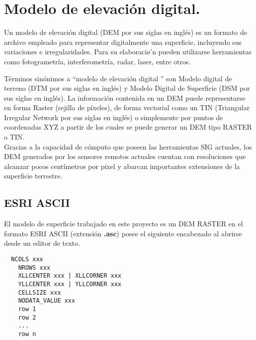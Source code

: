 \section{Modelo de elevaci\'{o}n digital.}


Un modelo de elevaci\'{o}n digital (DEM por sus siglas en ingl\'{e}s) es un formato de archivo empleado para representar digitalmente una superficie, incluyendo sus variaciones e irregularidades. Para su elaboraci\o'n pueden utilizarse herramientas como fotogrametr\'ia, interferometr\'ia, radar, laser, entre otros. \cite{whatisadem}


T\'{e}rminos sin\'{o}nimos a  ``modelo de elevaci\'{o}n digital '' son Modelo digital de terreno (DTM por
sus siglas en ingl\'{e}s) y Modelo Digital de Superficie (DSM por sus siglas en ingl\'{e}s).
La informaci\'{o}n contenida en un DEM puede representarse en forma Raster (rejilla de
p\'ixeles), de forma vectorial como un TIN (Triangular Irregular Network por sus siglas en
ingl\'{e}s) o simplemente por puntos de coordenadas XYZ a partir de los cuales se puede
generar un DEM tipo RASTER o TIN. \cite{tachikawa1994development} \\
 Gracias a la capacidad de c\'{o}mputo que poseen las
herramientas SIG actuales, los DEM generados por los sensores remotos actuales cuentan
con resoluciones que alcanzar pocos cent\'imetros por pixel y abarcan importantes extensiones de la superficie terrestre. \cite{zhang2002comparison}  \cite{hirt2010comparison}
\\
\subsection{ESRI ASCII}

El modelo de superficie trabajado en este proyecto es un DEM RASTER en el formato ESRI
ASCII (extensi\'{o}n \textbf{.asc}) posee el siguiente encabezado al abrirse desde un
editor de texto.

\begin{lstlisting}
  NCOLS xxx
    NROWS xxx
    XLLCENTER xxx | XLLCORNER xxx
    YLLCENTER xxx | YLLCORNER xxx
    CELLSIZE xxx
    NODATA_VALUE xxx
    row 1
    row 2
    ...
    row n
\end{lstlisting}


